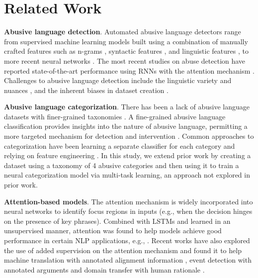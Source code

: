 \documentclass[letterpaper]{article} %
\begin{document}
\section{Related Work}
\label{sec:related}

\noindent\textbf{Abusive language detection}. Automated abusive language detectors range from supervised machine learning models built using a combination of manually crafted features such as n-grams \cite{wulczyn2017ex}, syntactic features \cite{nobata2016abusive}, and linguistic features \cite{yin2009detection,joksimovic2019automated}, to more recent neural networks \cite{park2017one,maity2018opinion}.
{The most recent studies on abuse detection have reported  state-of-the-art performance using RNNs with the attention mechanism  \cite{pavlopoulos2017deeper,chakrabarty2019pay}.} Challenges to abusive language detection include the linguistic variety and nuances \cite{nobata2016abusive,schmidt2017survey},  and the inherent biases in dataset creation \cite{vidgen2019challenges}.

\noindent\textbf{Abusive language categorization}. There has been a lack of abusive language datasets with finer-grained taxonomies \cite{park2017one,badjatiya2017deep,fortuna2018survey}. A fine-grained abusive language classification provides insights into the nature of abusive language, permitting a more targeted mechanism for detection and intervention \cite{hoff2009cyberbullying}.
Common approaches to categorization  have been learning a separate classifier for each category and relying on feature engineering \cite{van2015detection,dinakar2011modeling}. In this study, we  extend prior work by creating a dataset using a taxonomy of 4 abusive categories and then using it to train a neural categorization model via multi-task learning, an approach not explored in prior work.


\noindent\textbf{Attention-based models}.
The attention mechanism is widely incorporated into neural networks to identify focus regions in inputs (e.g., when the decision hinges on the presence of key phrases). Combined with LSTMs and learned in an unsupervised manner,  attention was  found to help models achieve good performance in certain NLP applications, e.g., \cite{luong2015effective}. Recent works have also explored the use of added supervision on the attention mechanism and found it  to help machine translation with annotated alignment information  \cite{liu2016neural}, event detection with annotated arguments  \cite{liu2017exploiting} and domain transfer with human rationale \cite{bao2018deriving}.
\end{document}
